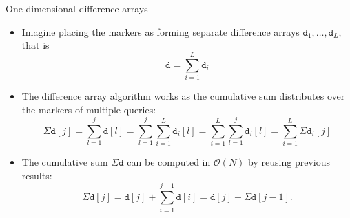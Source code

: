 \documentclass[
    t,10pt,
    handout
]{beamer}
\begin{document}
\begin{frame}[fragile]{One-dimensional difference arrays}
    \begin{itemize}[<+->]
        \item Imagine placing the markers as forming separate difference arrays \( \texttt{d}_1, \dots, \texttt{d}_L \), that is 
            \begin{equation*}
                \texttt{d} = \sum_{i=1}^L \texttt{d}_i 
            \end{equation*}

        \item The difference array algorithm works as the cumulative sum distributes over the markers of multiple queries: 
            \begin{equation*}
                \Sigma\texttt{d}[j] = \sum_{l=1}^j \texttt{d}[l] = \sum_{l=1}^j \sum_{i=1}^L \texttt{d}_i[l] = \sum_{i=1}^L \sum_{l=1}^j \texttt{d}_i[l] = \sum_{i=1}^L \Sigma \texttt{d}_i[j]
            \end{equation*}

        \item The cumulative sum \( \Sigma\texttt{d} \) can be computed in \( \mathcal{O}(N) \) by reusing previous results: 
            \begin{equation*}
                \Sigma\texttt{d}[j] = \texttt{d}[j] + \sum_{i=1}^{j-1} \texttt{d}[i] = \texttt{d}[j] + \Sigma\texttt{d}[j-1]. 
            \end{equation*}
    \end{itemize}
\end{frame}
\end{document}

